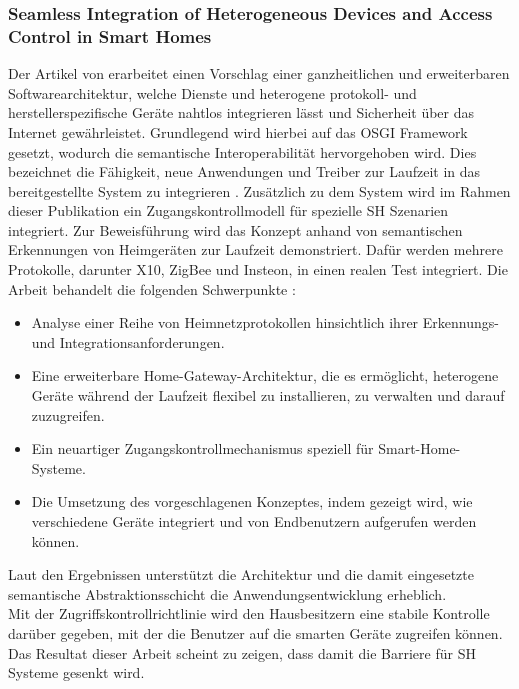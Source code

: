         \subsubsection*{Seamless Integration of Heterogeneous Devices and Access Control in Smart Homes}
            Der Artikel von \cite{Kim2012} erarbeitet einen Vorschlag einer ganzheitlichen und erweiterbaren 
            Softwarearchitektur, welche Dienste und heterogene protokoll- und herstellerspezifische Geräte 
            nahtlos integrieren lässt und Sicherheit über das Internet gewährleistet. Grundlegend wird hierbei auf das 
            \acs{OSGI} Framework gesetzt, wodurch die semantische Interoperabilität hervorgehoben wird. Dies bezeichnet die Fähigkeit, 
            neue Anwendungen und Treiber zur Laufzeit in das bereitgestellte System zu integrieren \cite{Kim2012}. 
            Zusätzlich zu dem System wird im Rahmen dieser Publikation ein Zugangskontrollmodell für spezielle \acl{SH} 
            Szenarien integriert. Zur Beweisführung wird das Konzept anhand von semantischen Erkennungen von Heimgeräten zur 
            Laufzeit demonstriert. Dafür werden mehrere Protokolle, darunter X10, ZigBee und Insteon, in einen realen Test 
            integriert. Die Arbeit behandelt die folgenden Schwerpunkte \cite{Kim2012}:
            \begin{itemize}
                \item Analyse einer Reihe von Heimnetzprotokollen hinsichtlich ihrer Erkennungs- und Integrationsanforderungen.
                \item Eine erweiterbare Home-Gateway-Architektur, die es ermöglicht, heterogene Geräte während der Laufzeit flexibel zu installieren, zu verwalten und darauf zuzugreifen.
                \item Ein neuartiger Zugangskontrollmechanismus speziell für Smart-Home-Systeme.
                \item Die Umsetzung des vorgeschlagenen Konzeptes, indem gezeigt wird, wie verschiedene Geräte integriert und von Endbenutzern aufgerufen werden können.
            \end{itemize}
            Laut den Ergebnissen unterstützt die Architektur und die damit eingesetzte semantische Abstraktionsschicht die Anwendungsentwicklung erheblich.
            \\
            Mit der Zugriffskontrollrichtlinie wird den Hausbesitzern eine stabile Kontrolle darüber gegeben, mit der 
            die Benutzer auf die smarten Geräte zugreifen können. Das Resultat dieser Arbeit scheint zu zeigen, dass damit 
            die Barriere für \acl{SH} Systeme gesenkt wird. 


